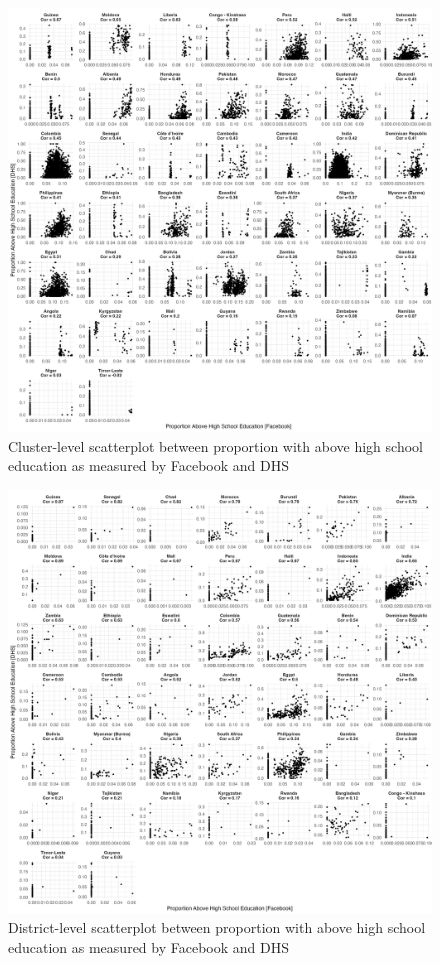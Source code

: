 \documentclass{article}
\begin{document}
\begin{figure}[H]
    \centering
    \includegraphics[width=1\textwidth]{figures/educ_fb_dhs_scatter_cluster.png}
    \caption{Cluster-level scatterplot between proportion with above high school education as measured by Facebook and DHS}
     \label{fig:educ_fb_dhs_scatter_cluster}
\end{figure}

\begin{figure}[H]
    \centering
    \includegraphics[width=1\textwidth]{figures/educ_fb_dhs_scatter_adm2.png}
    \caption{District-level scatterplot between proportion with above high school education as measured by Facebook and DHS}
     \label{fig:educ_fb_dhs_scatter_adm2}
\end{figure}
\end{document}
